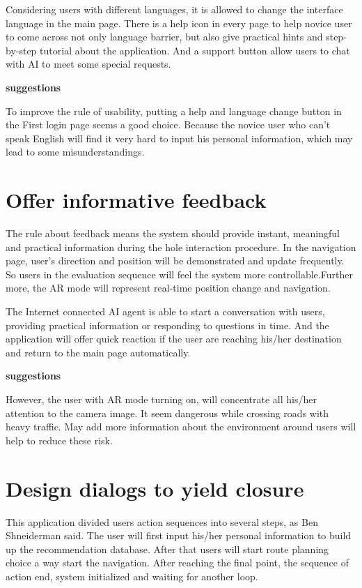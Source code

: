 \documentclass{article}
\begin{document}
	Considering users with different languages, it is allowed to change the interface language in the main page. There is a help icon in every page to help novice user to come across not only language barrier, but also give practical hints and step-by-step tutorial about the application. 
	And a support button allow users to chat with AI to meet some special requests.
	
	\textbf{suggestions}
	
	To improve the rule of usability, putting a help and language change button in the First login page
	seems a good choice. Because the novice user who can't speak English will find it very hard to input his
	personal information, which may lead to some misunderstandings.
	
	\section{Offer informative feedback}
	
	The rule about feedback means the system should provide instant, meaningful and practical information during the hole interaction procedure. In the navigation page, user's direction and position will be
	demonstrated and update frequently. So users in the evaluation sequence will feel the system more controllable.Further more, the AR mode will represent real-time position change and navigation.
	
	The Internet connected AI agent is able to start a conversation with users, providing practical information or responding to questions in time. And the application will offer quick reaction if the user are reaching his/her destination and return to the main page automatically.
	
		\textbf{suggestions}
		
	However, the user with AR mode turning on, will concentrate all his/her attention to the camera image. It seem dangerous while crossing roads with heavy traffic. May add more information about the environment around users will help to reduce these risk. 
	
	\section{Design dialogs to yield closure}
	This application divided users action sequences into several steps, as Ben Shneiderman said. The user will first input his/her personal information to build up the recommendation database. After that users will start route planning choice a way start the navigation. After reaching the final point, the sequence of action end, system initialized and waiting for another loop.
	
\end{document}
